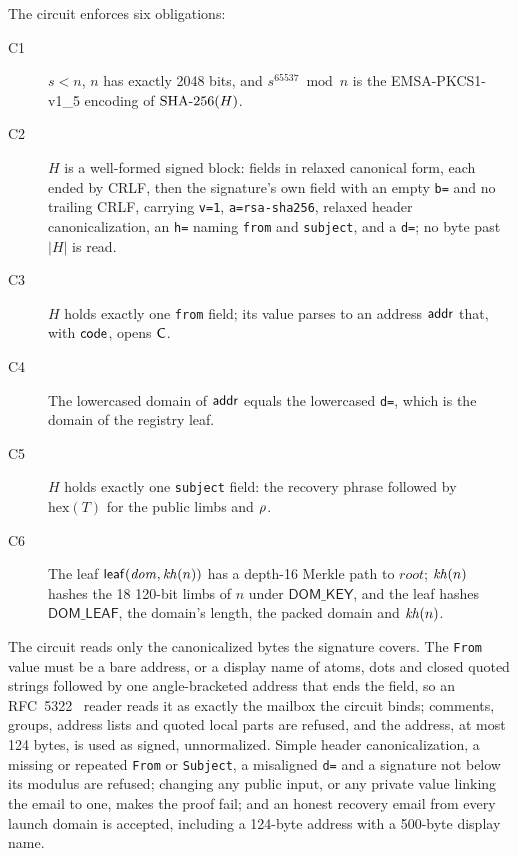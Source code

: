 The circuit enforces six obligations:
\begin{description}
  \item[C1] $s<n$, $n$ has exactly 2048 bits, and $s^{65537} \bmod n$ is the
    EMSA-PKCS1-v1\_5 encoding of $\mathrm{SHA\text{-}256}(H)$.
  \item[C2] $H$ is a well-formed signed block: fields in relaxed canonical
    form, each ended by CRLF, then the signature's own field with an empty
    \texttt{b=} and no trailing CRLF, carrying \texttt{v=1},
    \texttt{a=rsa-sha256}, relaxed header canonicalization, an \texttt{h=}
    naming \texttt{from} and \texttt{subject}, and a \texttt{d=}; no byte
    past $|H|$ is read.
  \item[C3] $H$ holds exactly one \texttt{from} field; its value parses to an
    address $\mathsf{addr}$ that, with $\mathsf{code}$, opens $\mathsf{C}$.
  \item[C4] The lowercased domain of $\mathsf{addr}$ equals the lowercased
    \texttt{d=}, which is the domain of the registry leaf.
  \item[C5] $H$ holds exactly one \texttt{subject} field: the recovery phrase
    followed by $\mathrm{hex}(T)$ for the public limbs and $\rho$.
  \item[C6] The leaf $\mathsf{leaf}(\mathit{dom}, \mathit{kh}(n))$ has a depth-16 Merkle
    path to $\mathit{root}$; $\mathit{kh}(n)$ hashes the 18 120-bit limbs of $n$
    under $\mathsf{DOM\_KEY}$, and the leaf hashes $\mathsf{DOM\_LEAF}$, the
    domain's length, the packed domain and $\mathit{kh}(n)$.
\end{description}
The circuit reads only the canonicalized bytes the signature covers. The
\texttt{From} value must be a bare address, or a display name of atoms, dots
and closed quoted strings followed by one angle-bracketed address that ends
the field, so an RFC~5322~\cite{rfc5322} reader reads it as exactly the
mailbox the circuit binds; comments, groups, address lists and quoted local
parts are refused, and the address, at most 124 bytes, is used as signed,
unnormalized. Simple header canonicalization, a
missing or repeated \texttt{From} or \texttt{Subject}, a misaligned
\texttt{d=} and a signature not below its modulus are
refused; changing any public input, or any private value linking the email
to one, makes the proof fail; and an honest recovery email from every launch
domain is accepted, including a 124-byte address with a 500-byte display
name.

